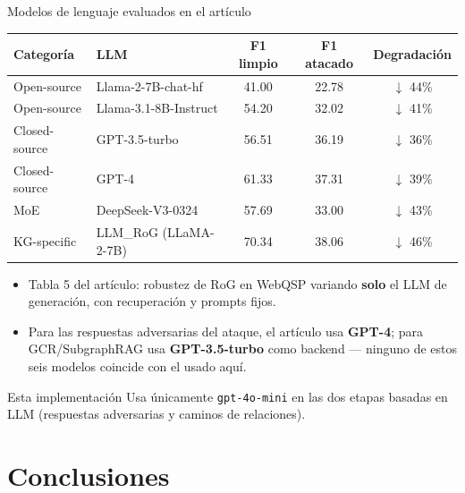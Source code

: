 \documentclass[aspectratio=169]{beamer}
\begin{document}
\begin{frame}{Modelos de lenguaje evaluados en el artículo}
  \footnotesize
  \centering
  \begin{tabular}{llccc}
    \toprule
    \textbf{Categoría} & \textbf{LLM} & \textbf{F1 limpio} & \textbf{F1 atacado} & \textbf{Degradación} \\
    \midrule
    Open-source     & Llama-2-7B-chat-hf    & 41.00 & 22.78 & $\downarrow$ 44\% \\
    Open-source     & Llama-3.1-8B-Instruct & 54.20 & 32.02 & $\downarrow$ 41\% \\
    Closed-source   & GPT-3.5-turbo         & 56.51 & 36.19 & $\downarrow$ 36\% \\
    Closed-source   & GPT-4                 & 61.33 & 37.31 & $\downarrow$ 39\% \\
    MoE             & DeepSeek-V3-0324      & 57.69 & 33.00 & $\downarrow$ 43\% \\
    KG-specific     & LLM\_RoG (LLaMA-2-7B) & 70.34 & 38.06 & $\downarrow$ 46\% \\
    \bottomrule
  \end{tabular}
  \vspace{0.5em}
  \begin{itemize}
    \small
    \item Tabla 5 del artículo: robustez de RoG en WebQSP variando \textbf{solo}
      el LLM de generación, con recuperación y prompts fijos.
    \item Para las respuestas adversarias del ataque, el artículo usa
      \textbf{GPT-4}; para GCR/SubgraphRAG usa \textbf{GPT-3.5-turbo} como
      backend --- ninguno de estos seis modelos coincide con el usado aquí.
  \end{itemize}
  \vspace{0.3em}
  \begin{alertblock}{Esta implementación}
    \small Usa únicamente \texttt{gpt-4o-mini} en las dos etapas basadas en
    LLM (respuestas adversarias y caminos de relaciones).
  \end{alertblock}
\end{frame}

\section{Conclusiones}
\end{document}

